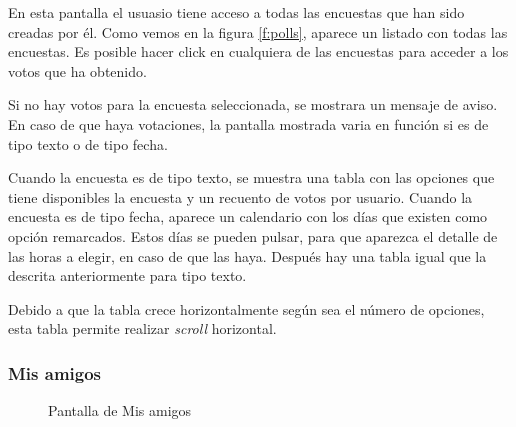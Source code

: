 \documentclass[a4paper, 12pt]{book}
\begin{document}
En esta pantalla el usuasio tiene acceso a todas las encuestas que han sido creadas por \'el.
Como vemos en la figura \ref{f:polls}, aparece un listado con todas las encuestas. Es posible hacer click en
cualquiera de las encuestas para acceder a los votos que ha obtenido.

Si no hay votos para la encuesta seleccionada, se mostrara un mensaje de aviso. En caso de que haya
votaciones, la pantalla mostrada varia en funci\'on si es de tipo texto o de tipo fecha.

Cuando la encuesta es de tipo texto, se muestra una tabla con las opciones que tiene disponibles la encuesta
y un recuento de votos por usuario. Cuando la encuesta es de tipo fecha, aparece un calendario con los d\'ias
que existen como opci\'on remarcados. Estos d\'ias se pueden pulsar, para que aparezca el detalle de las horas
a elegir, en caso de que las haya. Despu\'es hay una tabla igual que la descrita anteriormente para tipo texto.

Debido a que la tabla crece horizontalmente seg\'un sea el n\'umero de opciones, esta tabla permite realizar \emph{scroll} horizontal. 




\subsubsection{Mis amigos}
\label{sec:mis_amigos}

\begin{figure}[H]
 \centering
 \caption{Pantalla de Mis amigos}
 \label{f:mis_amigos}
\end{figure}
\end{document}
